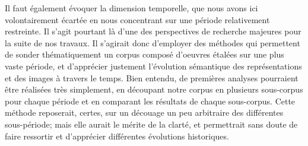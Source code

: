 \documentclass[letterpaper,portrait,12pt]{article}
\begin{document}
	Il faut \'{e}galement \'{e}voquer la dimension temporelle, que nous avons ici volontairement  \'{e}cart\'{e}e en nous concentrant sur une p\'{e}riode relativement restreinte. Il s'agit pourtant l\`{a} d'une des perspectives de recherche majeures pour la suite de nos travaux. Il s'agirait donc d'employer des m\'{e}thodes qui permettent de sonder th\'{e}matiquement un corpus compos\'{e} d'oeuvres \'{e}tal\'{e}es sur une plus vaste p\'{e}riode, et d'appr\'{e}cier justement l'\'{e}volution s\'{e}mantique des repr\'{e}sentations et des images \`{a} travers le temps. Bien entendu, de premi\`{e}res analyses pourraient \^{e}tre r\'{e}alis\'{e}es tr\`{e}s simplement, en d\'{e}coupant notre corpus en plusieurs sous-corpus pour chaque p\'{e}riode et en comparant les r\'{e}sultats de chaque sous-corpus. Cette m\'{e}thode reposerait, certes, sur un d\'{e}couage un peu arbitraire des diff\'{e}rentes sous-p\'{e}riode; mais elle aurait le m\'{e}rite de la clart\'{e}, et permettrait sans doute de faire ressortir et d'appr\'{e}cier diff\'{e}rentes \'{e}volutions historiques. 
\end{document}
